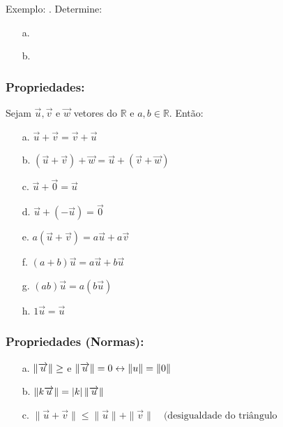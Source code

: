 \date{08-10-2024}

Exemplo: .
Determine: \\
\begin{itemize}
    \item[a.] \mathexpr{}
    \item[b. ]  \\
    
\end{itemize}

\subsubsection{Propriedades:}

Sejam $\overrightarrow{u}, \overrightarrow{v}$ e $\overrightarrow{w}$ vetores do $\mathbb{R}$ e $a,b \in \mathbb{R}$.
Então: \\
\begin{itemize}
    \item[a.] $\overrightarrow{u} + \overrightarrow{v} = \overrightarrow{v} + \overrightarrow{u}$
    \item[b.] $(\overrightarrow{u}+ \overrightarrow{v}) + \overrightarrow{w} = \overrightarrow{u} + (\overrightarrow{v} + \overrightarrow{w})$  
    \item[c.] $\overrightarrow{u} + \overrightarrow{0} = \overrightarrow{u}$ 
    \item[d.] $\overrightarrow{u} + (-\overrightarrow{u}) = \overrightarrow{0}$ 
    \item[e.] $a (\overrightarrow{u} + \overrightarrow{v}) = a \overrightarrow{u} + a \overrightarrow{v}$
    \item[f.] $(a+b) \overrightarrow{u} = a \overrightarrow{u} + b \overrightarrow{u}$ 
    \item[g.] $(ab) \overrightarrow{u} = a (b \overrightarrow{u})$
    \item[h.] $1 \overrightarrow{u} = \overrightarrow{u}$ 
\end{itemize}

\subsubsection{Propriedades (Normas):}
\begin{itemize}
    \item[a.] $\left\lVert \overrightarrow{u} \right\rVert \geq$ e $\left\lVert \overrightarrow{u} \right\rVert = 0 \leftrightarrow \left\lVert u \right\rVert = \left\lVert 0 \right\rVert$
    \item[b.] $\left\lVert k \overrightarrow{u} \right\rVert = |k| \left\lVert \overrightarrow{u} \right\rVert$ 
    \item[c.] $ \|\vec{u} + \vec{v}\| \leq \|\vec{u}\| + \|\vec{v}\| \quad (\text{desigualdade do triângulo}$ 
\end{itemize}

